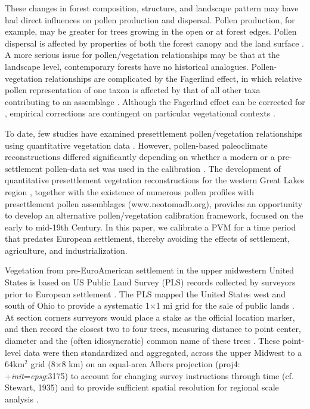\documentclass[12pt]{article}
\begin{document}
These changes in forest composition, structure, and landscape pattern
may have had direct influences on pollen production and dispersal.
Pollen production, for example, may be greater for trees growing in
the open or at forest edges.  Pollen dispersal is affected by
properties of both the forest canopy and the land surface
\citep{jackson1999pollen}.  A more serious issue for pollen/vegetation
relationships may be that at the landscape level, contemporary forests
have no historical analogues. Pollen-vegetation relationships are
complicated by the Fagerlind effect, in which relative pollen
representation of one taxon is affected by that of all other taxa
contributing to an assemblage \citep{prentice1988records}.  Although
the Fagerlind effect can be corrected for \citep{prentice1986,
  jackson1995exploration}, empirical corrections are contingent on
particular vegetational contexts \citep{jackson1998quantitative}.

To date, few studies have examined presettlement pollen/vegetation
relationships using quantitative vegetation data
\citep{schwartz1989predicting}.  However, pollen-based paleoclimate
reconstructions differed significantly depending on whether a modern
or a pre-settlement pollen-data set was used in the calibration
\citep{st2014bias}.  The development of quantitative presettlement
vegetation reconstructions for the western Great Lakes region
\citep{goring2015b}, together with the existence of numerous pollen
profiles with presettlement pollen assemblages (www.neotomadb.org),
provides an opportunity to develop an alternative pollen/vegetation
calibration framework, focused on the early to mid-19th Century.  In
this paper, we calibrate a PVM for a time period that predates
European settlement, thereby avoiding the effects of settlement,
agriculture, and industrialization.

Vegetation from pre-EuroAmerican settlement in the upper midwestern
United States is based on US Public Land Survey (PLS) records
collected by surveyors prior to European settlement
\citep{bourdo1956review, schulte2001original,
  almendinger1996minnesota}. The PLS mapped the United States west and
south of Ohio to provide a systematic 1$\times$1 mi grid for the sale
of public lands \citep{stewart1935public, white1983history}. At
section corners surveyors would place a stake as the official location
marker, and then record the closest two to four trees, measuring
distance to point center, diameter and the (often idiosyncratic)
common name of these trees \citep{mladenoff2002narrowing}.  These
point-level data were then standardized and aggregated, across the
upper Midwest to a 64km$^2$ grid (8$\times$8 km) on an equal-area
Albers projection (proj4: +\textit{init}=\textit{epsg}:3175) to
account for changing survey instructions through time (cf. Stewart,
1935) and to provide sufficient spatial resolution for regional scale
analysis \citep{goring2015b}.
\end{document}
